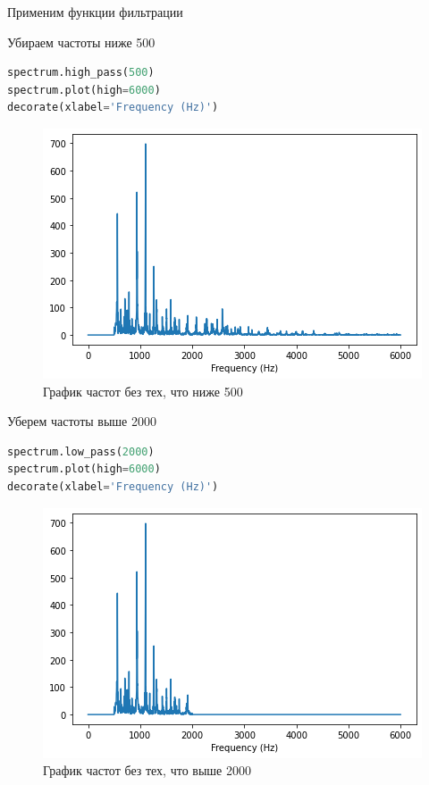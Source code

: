 Применим функции фильтрации

Убираем частоты ниже 500
\begin{lstlisting}[language=Python]
spectrum.high_pass(500)
spectrum.plot(high=6000)
decorate(xlabel='Frequency (Hz)')
\end{lstlisting}

\begin{figure}[H]
	\begin{center}
		\includegraphics[scale=1]{fig/lab01/lab01_04.png}
		\caption{График частот без тех, что ниже 500}
	\end{center}
\end{figure}

Уберем частоты выше 2000
\begin{lstlisting}[language=Python]
spectrum.low_pass(2000)
spectrum.plot(high=6000)
decorate(xlabel='Frequency (Hz)')
\end{lstlisting}

\begin{figure}[H]
	\begin{center}
		\includegraphics[scale=1]{fig/lab01/lab01_05.png}
		\caption{График частот без тех, что выше 2000}
	\end{center}
\end{figure}

